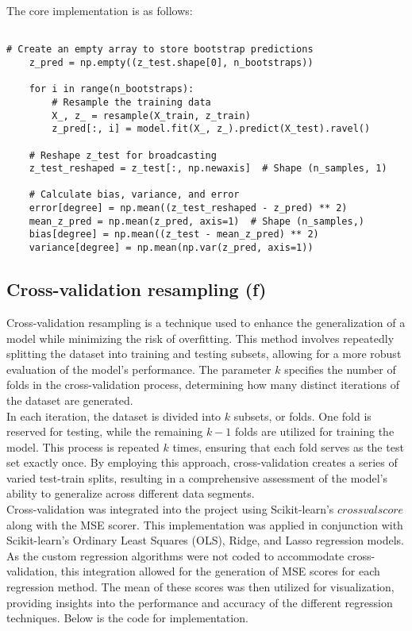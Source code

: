 \documentclass{article}
\begin{document}
\begin{enumerate}
The core implementation is as follows:

\begin{verbatim} 

# Create an empty array to store bootstrap predictions
    z_pred = np.empty((z_test.shape[0], n_bootstraps))

    for i in range(n_bootstraps):
        # Resample the training data
        X_, z_ = resample(X_train, z_train)
        z_pred[:, i] = model.fit(X_, z_).predict(X_test).ravel()

    # Reshape z_test for broadcasting
    z_test_reshaped = z_test[:, np.newaxis]  # Shape (n_samples, 1)

    # Calculate bias, variance, and error
    error[degree] = np.mean((z_test_reshaped - z_pred) ** 2)
    mean_z_pred = np.mean(z_pred, axis=1)  # Shape (n_samples,)
    bias[degree] = np.mean((z_test - mean_z_pred) ** 2)
    variance[degree] = np.mean(np.var(z_pred, axis=1))
\end{verbatim}






\subsection{Cross-validation resampling (f)}

Cross-validation resampling is a technique used to enhance the generalization of a model while minimizing the risk of overfitting. This method involves repeatedly splitting the dataset into training and testing subsets, allowing for a more robust evaluation of the model’s performance. The parameter \(k\) specifies the number of folds in the cross-validation process, determining how many distinct iterations of the dataset are generated.\\

In each iteration, the dataset is divided into \(k\)  subsets, or folds. One fold is reserved for testing, while the remaining \(k-1\)  folds are utilized for training the model. This process is repeated \(k\)  times, ensuring that each fold serves as the test set exactly once. By employing this approach, cross-validation creates a series of varied test-train splits, resulting in a comprehensive assessment of the model’s ability to generalize across different data segments.\\

Cross-validation was integrated into the project using \cite{scikit-learn} Scikit-learn’s \(cross val score \)  along with the MSE scorer. This implementation was applied in conjunction with Scikit-learn’s Ordinary Least Squares (OLS), Ridge, and Lasso regression models. As the custom regression algorithms were not coded to accommodate cross-validation, this integration allowed for the generation of MSE scores for each regression method. The mean of these scores was then utilized for visualization, providing insights into the performance and accuracy of the different regression techniques. Below is the code for implementation.\\


\end{enumerate}
\end{document}
